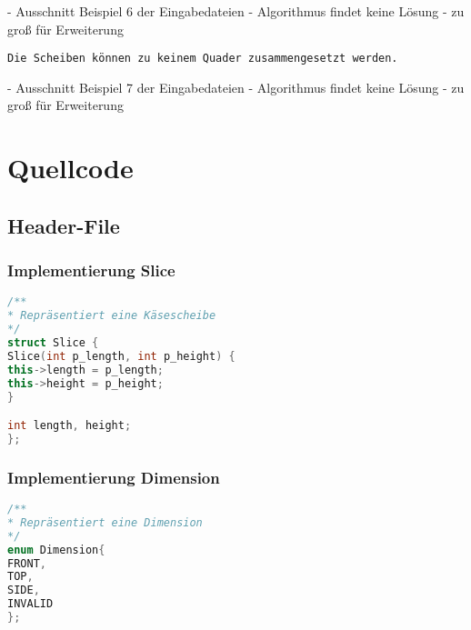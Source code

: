 \documentclass[a4paper,10pt,ngerman]{scrartcl}
\begin{document}
    - Ausschnitt Beispiel 6 der Eingabedateien
    - Algorithmus findet keine Lösung
    - zu groß für Erweiterung

    \begin{lstlisting}[frame=single, title=Programmausgabe kaese7.txt, breaklines=true,label={lst:lstlisting12}]
Die Scheiben können zu keinem Quader zusammengesetzt werden.
    \end{lstlisting}

    - Ausschnitt Beispiel 7 der Eingabedateien
    - Algorithmus findet keine Lösung
    - zu groß für Erweiterung


    \newpage


    \section{Quellcode}
    \label{sec:quellcode}
    \label{LastPage}

    \subsection{Header-File}\label{subsec:header-file}
    \subsubsection{Implementierung Slice}

    \begin{lstlisting}[frame=single,language=C++,title=Struct Slice,breaklines=true,label={lst:code_slice}]
/**
* Repräsentiert eine Käsescheibe
*/
struct Slice {
Slice(int p_length, int p_height) {
this->length = p_length;
this->height = p_height;
}

int length, height;
};
    \end{lstlisting}

    \subsubsection{Implementierung Dimension}
    \begin{lstlisting}[frame=single,language=C++,title=Enum Dimension,breaklines=true,label={lst:code_dimension}]
/**
* Repräsentiert eine Dimension
*/
enum Dimension{
FRONT,
TOP,
SIDE,
INVALID
};
    \end{lstlisting}
\end{document}
